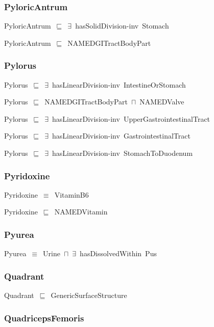 \documentclass{article}
\begin{document}
\subsubsection*{PyloricAntrum}

PyloricAntrum~\ensuremath{\sqsubseteq}~\ensuremath{\exists}~hasSolidDivision-inv~Stomach~

PyloricAntrum~\ensuremath{\sqsubseteq}~NAMEDGITractBodyPart~

\subsubsection*{Pylorus}

Pylorus~\ensuremath{\sqsubseteq}~\ensuremath{\exists}~hasLinearDivision-inv~IntestineOrStomach~

Pylorus~\ensuremath{\sqsubseteq}~NAMEDGITractBodyPart~\ensuremath{\sqcap}~NAMEDValve~

Pylorus~\ensuremath{\sqsubseteq}~\ensuremath{\exists}~hasLinearDivision-inv~UpperGastrointestinalTract~

Pylorus~\ensuremath{\sqsubseteq}~\ensuremath{\exists}~hasLinearDivision-inv~GastrointestinalTract~

Pylorus~\ensuremath{\sqsubseteq}~\ensuremath{\exists}~hasLinearDivision-inv~StomachToDuodenum~

\subsubsection*{Pyridoxine}

Pyridoxine~\ensuremath{\equiv}~VitaminB6

Pyridoxine~\ensuremath{\sqsubseteq}~NAMEDVitamin~

\subsubsection*{Pyurea}

Pyurea~\ensuremath{\equiv}~Urine~\ensuremath{\sqcap}~\ensuremath{\exists}~hasDissolvedWithin~Pus

\subsubsection*{Quadrant}

Quadrant~\ensuremath{\sqsubseteq}~GenericSurfaceStructure~

\subsubsection*{QuadricepsFemoris}
\end{document}
